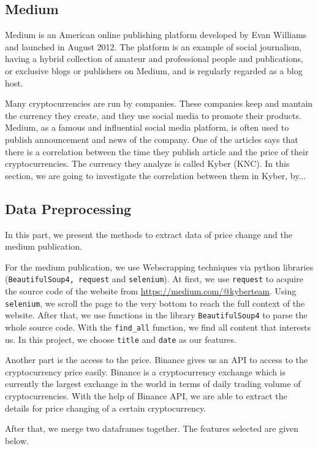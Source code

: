 \documentclass[twoside]{report}
\newcommand{\code}{\texttt}
\begin{document}
\begin{spacing}{1}
\section{Medium}
Medium is an American online publishing platform developed by Evan Williams and launched in August 2012.  The platform is an example of social journalism, having a hybrid collection of amateur and professional people and publications, or exclusive blogs or publishers on Medium, and is regularly regarded as a blog host.

Many cryptocurrencies are run by companies. These companies keep and mantain the currency they create, and they use social media to promote their products. Medium, as a famous and influential social media platform, is often used to publish announcement and news of the company. One of the articles says that there is a correlation between the time they publish article and the price of their cryptocurrencies. The currency they analyze is called Kyber (KNC). In this section, we are going to investigate the correlation between them in Kyber, by...



\subsection{Data Preprocessing}
In this part, we present the methods to extract data of price change and the medium publication. 

For the medium publication, we use Webscrapping techniques via python libraries (\code{BeautifulSoup4, request} and \code{selenium}). At first, we use \code{request} to acquire the source code of the website from \url{https://medium.com/@kyberteam}. Using \code{selenium}, we scroll the page to the very bottom to reach the full context of the website. After that, we use functions in the library \code{BeautifulSoup4} to parse the whole source code. With the \code{find\_all} function, we find all content that interests us. In this project, we choose \code{title} and \code{date} as our features.

Another part is the access to the price. Binance gives us an API to access to the cryptocurrency price easily. Binance is a cryptocurrency exchange which is currently the largest exchange in the world in terms of daily trading volume of cryptocurrencies. With the help of Binance API, we are able to extract the details for price changing of a certain cryptocurrency.

After that, we merge two dataframes together. The features selected are given below.


\end{spacing}
\end{document}
